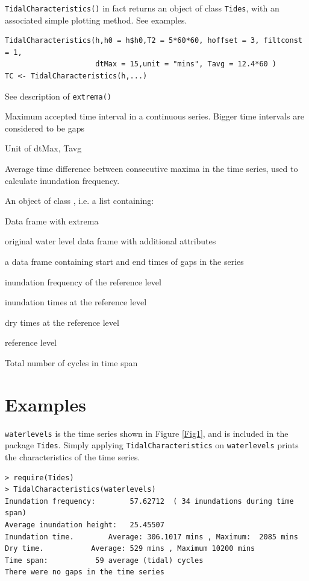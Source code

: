 \documentclass[10pt,a4wide]{article}
\begin{document}
\texttt{TidalCharacteristics()} in fact returns an object of class \texttt{Tides}, with an associated simple plotting method. See examples. 
\begin{Usage}
\begin{verbatim}TidalCharacteristics(h,h0 = h$h0,T2 = 5*60*60, hoffset = 3, filtconst = 1, 
                     dtMax = 15,unit = "mins", Tavg = 12.4*60 ) 
TC <- TidalCharacteristics(h,...)\end{verbatim}
\end{Usage}
\begin{Arguments}
\begin{ldescription}
\item[\code{h, h0, T2, hoffset, filtconst }] See description of \texttt{extrema()}
\item[\code{dtMax}] Maximum accepted time interval in a continuous series. Bigger time intervals are considered to be gaps
\item[\code{unit}] Unit of dtMax, Tavg
\item[\code{Tavg}] Average time difference between consecutive maxima in the time series, used to calculate inundation frequency.
\end{ldescription}
\end{Arguments}
\begin{Value}
An object of class , i.e. a list containing:
\begin{ldescription}
\item[\code{HL }] Data frame with extrema
\item[\code{h }] original water level data frame with additional attributes
\item[\code{gaps}] a data frame containing start and end times of gaps in the series
\item[\code{IF}] inundation frequency of the reference level
\item[\code{ITs}] inundation times at the reference level
\item[\code{DTs}] dry times at the reference level
\item[\code{h0}] reference level
\item[\code{N}] Total number of cycles in time span
\end{ldescription}
\end{Value}

\section{Examples}
\texttt{waterlevels} is the time series shown in Figure \ref{Fig1}, and is included in the package \texttt{Tides}. Simply applying \texttt{TidalCharacteristics} on \texttt{waterlevels} prints the characteristics of the time series.
\begin{verbatim}
> require(Tides)
> TidalCharacteristics(waterlevels)
Inundation frequency:		 57.62712  ( 34 inundations during time span) 
Average inundation height:	 25.45507 
Inundation time. 		Average: 306.1017 mins , Maximum:  2085 mins 
Dry time. 			Average: 529 mins , Maximum 10200 mins 
Time span:			 59 average (tidal) cycles 
There were no gaps in the time series 
\end{verbatim}
\end{document}
